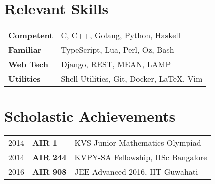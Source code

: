 \documentclass[10pt, margin=0.5in]{deedy-resume-openfont}
\begin{document}
\begin{minipage}[t]{0.48\textwidth}
\section{Relevant Skills}
\vspace{0pt}
\begin{tabular}{ll}
 \textbf{Competent}  & C, C++, Golang, Python, Haskell \\
 \textbf{Familiar}   & TypeScript, Lua, Perl, Oz, Bash \\
 \textbf{Web Tech}   & Django, REST, MEAN, LAMP \\
 \textbf{Utilities}  & Shell Utilities, Git, Docker, \LaTeX, Vim
\end{tabular}


%
%
\section{Scholastic Achievements}
\vspace{0pt}
\begin{tabular}{lll}
  2014	   & \textbf{AIR 1}  & KVS Junior Mathematics Olympiad\\
  2014	   & \textbf{AIR 244}& KVPY-SA Fellowship, IISc Bangalore \\
  2016     & \textbf{AIR 908}& JEE Advanced 2016, IIT Guwahati \\
\end{tabular}

%


%
%

\end{minipage}
\hfill
\end{document}
